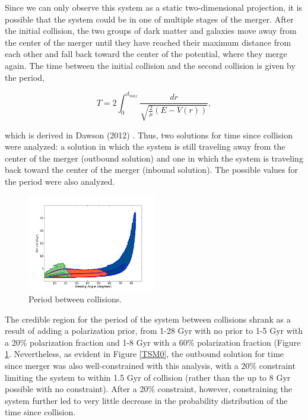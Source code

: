 \documentclass[12 pt]{article}
\renewcommand{\baselinestretch}{2}
\begin{document}
Since we can only observe this system as a static two-dimensional projection, it is possible that the system could be in one of multiple stages of the merger. After the initial collision, the two groups of dark matter and galaxies move away from the center of the merger until they have reached their maximum distance from each other and fall back toward the center of the potential, where they merge again. The time between the initial collision and the second collision is given by the period, 

\renewcommand{\baselinestretch}{1}
\begin{equation}
\label{T}
T=2 \int_0^{d_{max}} \frac{dr}{\sqrt{\frac{2}{\mu} (E-V(r))}},
\end{equation}
\renewcommand{\baselinestretch}{2}

which is derived in Dawson (2012) \cite{Dawson13}. Thus, two solutions for time since collision were analyzed: a solution in which the system is still traveling away from the center of the merger (outbound solution) and one in which the system is traveling back toward the center of the merger (inbound solution).  The possible values for the period were also analyzed.

\renewcommand{\baselinestretch}{1}
\begin{figure}[h]
\caption{Period between collisions.}
\label{period}
\centering
\includegraphics[width=0.5\textwidth]{alpha_T}
\end{figure}
\renewcommand{\baselinestretch}{2}

The credible region for the period of the system between collisions shrank as a result of adding a polarization prior, from 1-28 Gyr with no prior to 1-5 Gyr with a 20\% polarization fraction and 1-8 Gyr with a 60\% polarization fraction (Figure \ref{period}. Nevertheless, as evident in Figure \ref{TSM0}, the outbound solution for time since merger was also well-constrained with this analysis, with a 20\% constraint limiting the system to within 1.5 Gyr of collision (rather than the up to 8 Gyr possible with no constraint). After a 20\% constraint, however, constraining the system further led to very little decrease in the probability distribution of the time since collision.
\end{document}
